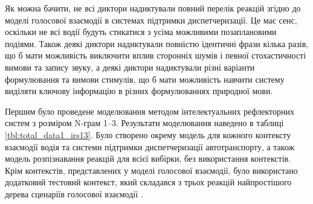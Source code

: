Як можна бачити, не всі диктори надиктували повний перелік реакцій згідно до моделі голосової взаємодії в системах підтримки диспетчеризації. Це має сенс, оскільки не всі водії будуть стикатися з усіма можливими позаплановими подіями. Також деякі диктори надиктували повністю ідентичні фрази кілька разів, що б мати можливість виключити вплив сторонніх шумів і певної стохастичності вимови та запису звуку, а деякі диктори надиктували різні варіанти формулювання та вимови стимулів, що б мати можливість навчити систему виділяти ключову інформацію в різних формулюваннях природної мови.

Першим було проведене моделювання методом інтелектуальних рефлекторних систем з розміром N-грам 1–3. Результати моделювання наведено в таблиці \ref{tbl:total_data1_irs13}. Було створено окрему модель для кожного контексту взаємодії водія та системи підтримки диспетчеризації автотранспорту, а також модель розпізнавання реакцій для всієї вибірки, без використання контекстів. Крім контекстів, представлених у моделі голосової взаємодії, було використано додатковий тестовий контекст, який складався з трьох реакцій найпростішого дерева сценаріїв голосової взаємодії \cite{art3}.

